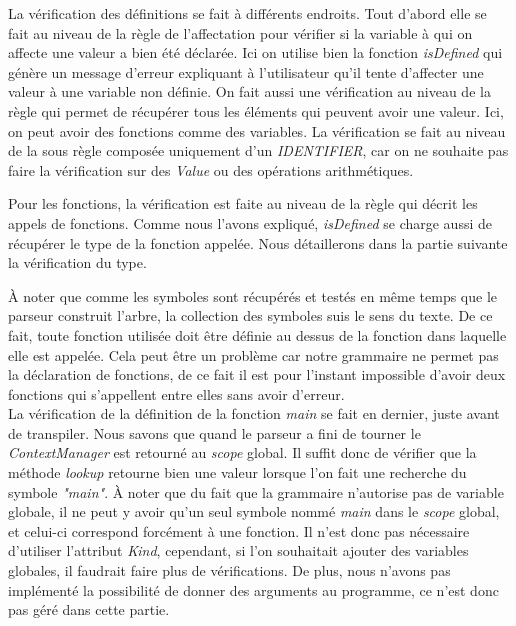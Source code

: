 \documentclass[a4paper]{article}%
\begin{document}
La vérification des définitions se fait à différents endroits. Tout d'abord elle
se fait au niveau de la règle de l'affectation pour vérifier si la variable à
qui on affecte une valeur a bien été déclarée. Ici on utilise bien la fonction
\textit{isDefined} qui génère un message d'erreur expliquant à l'utilisateur
qu'il tente d'affecter une valeur à une variable non définie. On fait aussi une
vérification au niveau de la règle qui permet de récupérer tous les éléments qui
peuvent avoir une valeur. Ici, on peut avoir des fonctions comme des variables.
La vérification se fait au niveau de la sous règle composée uniquement d'un
\textit{IDENTIFIER}, car on ne souhaite pas faire la vérification sur des
\textit{Value} ou des opérations arithmétiques.

Pour les fonctions, la vérification est faite au niveau de la règle qui décrit
les appels de fonctions. Comme nous l'avons expliqué, \textit{isDefined} se
charge aussi de récupérer le type de la fonction appelée. Nous détaillerons dans
la partie suivante la vérification du type.

À noter que comme les symboles sont récupérés et testés en même temps que le
parseur construit l'arbre, la collection des symboles suis le sens du texte. De
ce fait, toute fonction utilisée doit être définie au dessus de la fonction dans
laquelle elle est appelée. Cela peut être un problème car notre grammaire ne
permet pas la déclaration de fonctions, de ce fait il est pour l'instant
impossible d'avoir deux fonctions qui s'appellent entre elles sans avoir
d'erreur.\\

La vérification de la définition de la fonction \textit{main} se fait en
dernier, juste avant de transpiler. Nous savons que quand le parseur a fini de
tourner le \textit{ContextManager} est retourné au \textit{scope} global. Il
suffit donc de vérifier que la méthode \textit{lookup} retourne bien une valeur
lorsque l'on fait une recherche du symbole \textit{"main"}. À noter que du fait
que la grammaire n'autorise pas de variable globale, il ne peut y avoir qu'un
seul symbole nommé \textit{main} dans le \textit{scope} global, et celui-ci
correspond forcément à une fonction. Il n'est donc pas nécessaire d'utiliser
l'attribut \textit{Kind}, cependant, si l'on souhaitait ajouter des variables
globales, il faudrait faire plus de vérifications. De plus, nous n'avons pas
implémenté la possibilité de donner des arguments au programme, ce n'est donc
pas géré dans cette partie. %
\end{document}
